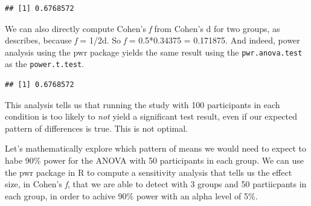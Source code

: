 \documentclass[]{book}
\newenvironment{Shaded}{\begin{snugshade}}{\end{snugshade}}
\newcommand{\DataTypeTok}[1]{\textcolor[rgb]{0.13,0.29,0.53}{#1}}
\newcommand{\DecValTok}[1]{\textcolor[rgb]{0.00,0.00,0.81}{#1}}
\newcommand{\FloatTok}[1]{\textcolor[rgb]{0.00,0.00,0.81}{#1}}
\newcommand{\KeywordTok}[1]{\textcolor[rgb]{0.13,0.29,0.53}{\textbf{#1}}}
\newcommand{\NormalTok}[1]{#1}
\newcommand{\OperatorTok}[1]{\textcolor[rgb]{0.81,0.36,0.00}{\textbf{#1}}}
\newcommand{\StringTok}[1]{\textcolor[rgb]{0.31,0.60,0.02}{#1}}
\begin{document}
\begin{Shaded}
\end{Shaded}

\begin{verbatim}
## [1] 0.6768572
\end{verbatim}

We can also directly compute Cohen's \emph{f} from Cohen's d for two groups, as \citet{cohen1988spa} describes, because \emph{f} = 1/2d. So \emph{f} = 0.5*0.34375 = 0.171875. And indeed, power analysis using the pwr package yields the same result using the \texttt{pwr.anova.test} as the \texttt{power.t.test}.

\begin{Shaded}
\end{Shaded}

\begin{verbatim}
## [1] 0.6768572
\end{verbatim}

This analysis tells us that running the study with 100 participants in each condition is too likely to \emph{not} yield a significant test result, even if our expected pattern of differences is true. This is not optimal.

Let's mathematically explore which pattern of means we would need to expect to habe 90\% power for the ANOVA with 50 participants in each group. We can use the pwr package in R to compute a sensitivity analysis that tells us the effect size, in Cohen's \emph{f}, that we are able to detect with 3 groups and 50 partiicpants in each group, in order to achive 90\% power with an alpha level of 5\%.
\end{document}

